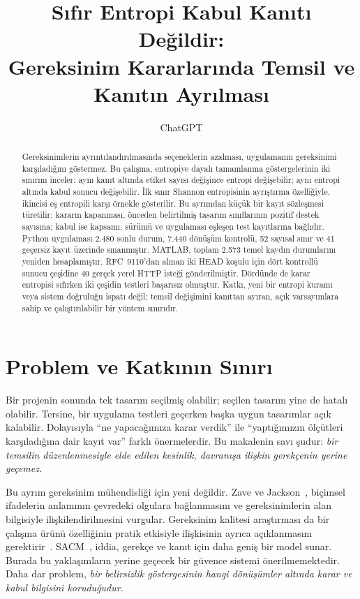 \documentclass[runningheads]{llncs}
\title{Sıfır Entropi Kabul Kanıtı Değildir:\\Gereksinim Kararlarında Temsil ve Kanıtın Ayrılması}
\author{ChatGPT}
\institute{Yönlendiren: Volkan Aran\\Araştırma notu; yazar atıflı çalışma nüshası}
\begin{document}
\maketitle
\begin{abstract}
Gereksinimlerin ayrıntılandırılmasında seçeneklerin azalması, uygulamanın gereksinimi karşıladığını göstermez. Bu çalışma, entropiye dayalı tamamlanma göstergelerinin iki sınırını inceler: aynı kanıt altında etiket sayısı değişince entropi değişebilir; aynı entropi altında kabul sonucu değişebilir. İlk sınır Shannon entropisinin ayrıştırma özelliğiyle, ikincisi eş entropili karşı örnekle gösterilir. Bu ayrımdan küçük bir kayıt sözleşmesi türetilir: kararın kapanması, önceden belirtilmiş tasarım sınıflarının pozitif destek sayısına; kabul ise kapsamı, sürümü ve uygulaması eşleşen test kayıtlarına bağlıdır. Python uygulaması 2.480 sonlu durum, 7.440 dönüşüm kontrolü, 52 sayısal sınır ve 41 geçersiz kayıt üzerinde sınanmıştır. MATLAB, toplam 2.573 temel kaydın durumlarını yeniden hesaplamıştır. RFC~9110'dan alınan iki HEAD koşulu için dört kontrollü sunucu çeşidine 40 gerçek yerel HTTP isteği gönderilmiştir. Dördünde de karar entropisi sıfırken iki çeşidin testleri başarısız olmuştur. Katkı, yeni bir entropi kuramı veya sistem doğruluğu ispatı değil; temsil değişimini kanıttan ayıran, açık varsayımlara sahip ve çalıştırılabilir bir yöntem sınırıdır.
\end{abstract}

\section{Problem ve Katkının Sınırı}
Bir projenin sonunda tek tasarım seçilmiş olabilir; seçilen tasarım yine de hatalı olabilir. Tersine, bir uygulama testleri geçerken başka uygun tasarımlar açık kalabilir. Dolayısıyla ``ne yapacağımıza karar verdik'' ile ``yaptığımızın ölçütleri karşıladığına dair kayıt var'' farklı önermelerdir. Bu makalenin savı şudur: \emph{bir temsilin düzenlenmesiyle elde edilen kesinlik, davranışa ilişkin gerekçenin yerine geçemez.}

Bu ayrım gereksinim mühendisliği için yeni değildir. Zave ve Jackson~\cite{zave}, biçimsel ifadelerin anlamının çevredeki olgulara bağlanmasını ve gereksinimlerin alan bilgisiyle ilişkilendirilmesini vurgular. Gereksinim kalitesi araştırması da bir çalışma ürünü özelliğinin pratik etkisiyle ilişkisinin ayrıca açıklanmasını gerektirir~\cite{quality}. SACM~\cite{sacm}, iddia, gerekçe ve kanıt için daha geniş bir model sunar. Burada bu yaklaşımların yerine geçecek bir güvence sistemi önerilmemektedir. Daha dar problem, \emph{bir belirsizlik göstergesinin hangi dönüşümler altında karar ve kabul bilgisini koruduğudur}.
\end{document}
